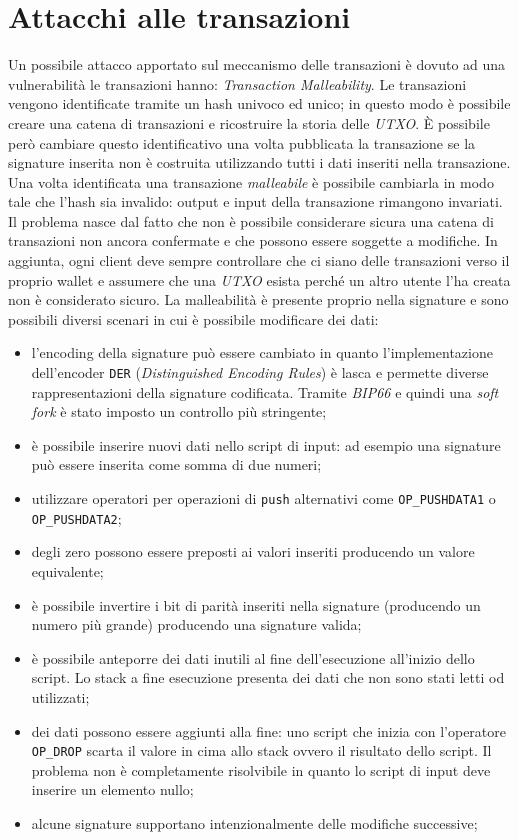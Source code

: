 \section{Attacchi alle transazioni}
Un possibile attacco apportato sul meccanismo delle transazioni è dovuto ad una vulnerabilità le transazioni hanno: \textit{Transaction Malleability}.\newline
Le transazioni vengono identificate tramite un hash univoco ed unico; in questo modo è possibile creare una catena di transazioni e ricostruire la storia delle \textit{UTXO}. È possibile però cambiare questo identificativo una volta pubblicata la transazione se la signature inserita non è costruita utilizzando tutti i dati inseriti nella transazione. Una volta identificata una transazione \textit{malleabile} è possibile cambiarla in modo tale che l'hash sia invalido: output e input della transazione rimangono invariati. Il problema nasce dal fatto che non è possibile considerare sicura una catena di transazioni non ancora confermate e che possono essere soggette a modifiche. In aggiunta, ogni client deve sempre controllare che ci siano delle transazioni verso il proprio wallet e assumere che una \textit{UTXO} esista perché un altro utente l'ha creata non è considerato sicuro.\newline
La malleabilità è presente proprio nella signature e sono possibili diversi scenari in cui è possibile modificare dei dati:
\begin{itemize}
    \item l'encoding della signature può essere cambiato in quanto l'implementazione dell'encoder \texttt{DER} (\textit{Distinguished Encoding Rules}) è lasca e permette diverse rappresentazioni della signature codificata. Tramite \textit{BIP66} e quindi una \textit{soft fork} è stato imposto un controllo più stringente;
    \item è possibile inserire nuovi dati nello script di input: ad esempio una signature può essere inserita come somma di due numeri;
    \item utilizzare operatori per operazioni di \texttt{push} alternativi come \texttt{OP\_PUSHDATA1} o \texttt{OP\_PUSHDATA2};
    \item degli zero possono essere preposti ai valori inseriti producendo un valore equivalente;
    \item è possibile invertire i bit di parità inseriti nella signature (producendo un numero più grande) producendo una signature valida;
    \item è possibile anteporre dei dati inutili al fine dell'esecuzione all'inizio dello script. Lo stack a fine esecuzione presenta dei dati che non sono stati letti od utilizzati;
    \item dei dati possono essere aggiunti alla fine: uno script che inizia con l'operatore \texttt{OP\_DROP} scarta il valore in cima allo stack ovvero il risultato dello script. Il problema non è completamente risolvibile in quanto lo script di input deve inserire un elemento nullo;
    \item alcune signature supportano intenzionalmente delle modifiche successive;
\end{itemize}
